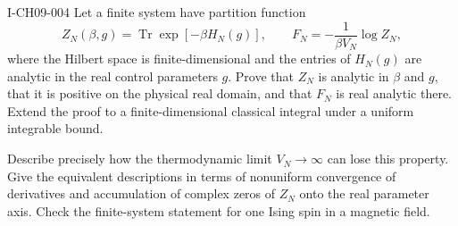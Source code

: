 \begin{exercise}{I-CH09-004}
Let a finite system have partition function
\[
  Z_N(\beta,g)=\operatorname{Tr}\exp[-\beta H_N(g)],
  \qquad
  F_N=-\frac{1}{\beta V_N}\log Z_N,
\]
where the Hilbert space is finite-dimensional and the entries of $H_N(g)$ are
analytic in the real control parameters $g$.  Prove that $Z_N$ is analytic in
$\beta$ and $g$, that it is positive on the physical real domain, and that
$F_N$ is real analytic there.  Extend the proof to a finite-dimensional
classical integral under a uniform integrable bound.

Describe precisely how the thermodynamic limit $V_N\to\infty$ can lose this
property.  Give the equivalent descriptions in terms of nonuniform
convergence of derivatives and accumulation of complex zeros of $Z_N$ onto
the real parameter axis.  Check the finite-system statement for one Ising
spin in a magnetic field.
\end{exercise}
